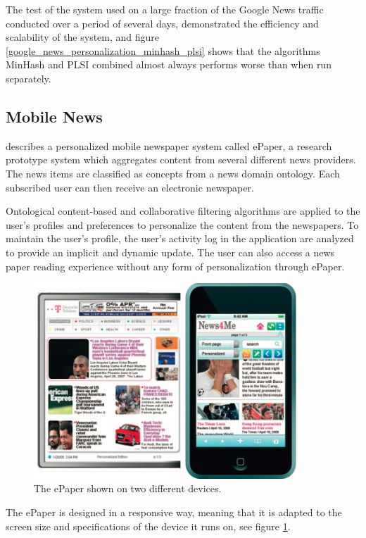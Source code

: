 The test of the system used on a large fraction of the Google News traffic conducted over a period of several days, demonstrated the efficiency and scalability of the system, and figure \ref{google_news_personalization_minhash_plsi} shows that the algorithms MinHash and PLSI combined almost always performs worse than when run separately.


\subsection{Mobile News}

\cite{shapira2009epaper} describes a personalized mobile newspaper system called ePaper, a research prototype system which aggregates content from several different news providers. The news items are classified as concepts from a news domain ontology. Each subscribed user can then receive an electronic newspaper.

Ontological content-based and collaborative filtering algorithms are applied to the user's profiles and preferences to personalize the content from the newspapers. To maintain the user's profile, the user's activity log in the application are analyzed to provide an implicit and dynamic update. The user can also access a news paper reading experience without any form of personalization through ePaper.

\begin{figure}[!htbp]
\centering
\includegraphics[width=100mm]{GFX/screenshots/ePaper.png}
\caption{The ePaper shown on two different devices.}
\label{screenshots_ePaper}
\end{figure}

The ePaper is designed in a responsive way, meaning that it is adapted to the screen size and specifications of the device it runs on, see figure \ref{screenshots_ePaper}.



